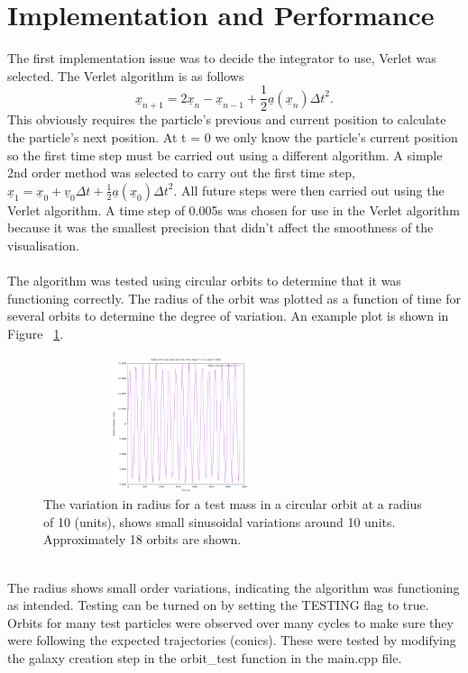 \documentclass[10pt,a4paper]{article}
\begin{document}
\section{Implementation and Performance}
The first implementation issue was to decide the integrator to use, Verlet was selected. The Verlet algorithm is as follows 
\begin{equation}
	\underline{x}_{n+1} = 2 \underline{x}_n - \underline{x}_{n-1} + \frac{1}{2}  \underline{a}(\underline{x}_n) {\Delta t }^ 2 .
\end{equation}  
This obviously requires the particle's previous and current position to calculate the particle's next position. At t = 0 we only know the particle's current position so the first time step must be carried out using a different algorithm. A simple 2nd order method was selected to carry out the first time step, $\underline{x}_{1} =  \underline{x}_0 + \underline{v}_0 {\Delta t} + \frac{1}{2}  \underline{a}(\underline{x}_0) {\Delta t }^ 2 .$ All future steps were then carried out using the Verlet algorithm. A time step of 0.005s was chosen for use in the Verlet algorithm because it was the smallest precision that didn't affect the smoothness of the visualisation.
\\
\\
The algorithm was tested using circular orbits to determine that it was functioning correctly. The radius of the orbit was plotted as a function of time for several orbits to determine the degree of variation. An example plot is shown in Figure ~\ref{fig:fig}. 
\begin{figure}[ht!]
\centering
\includegraphics[width=80mm, height=40mm]{../output/Radius.png}
\caption{The variation in radius for a test mass in a circular orbit at a radius of 10 (units), shows small sinusoidal variations around 10 units. Approximately 18 orbits are shown.
\label{fig:fig}}
\end{figure}
\\
The radius shows small order variations, indicating the algorithm was functioning as intended. Testing can be turned on by setting the TESTING flag to true. Orbits for many test particles were observed over many cycles to make sure they were following the expected trajectories (conics). These were tested by modifying the galaxy creation step in the orbit\_test function in the main.cpp file.
\end{document}
